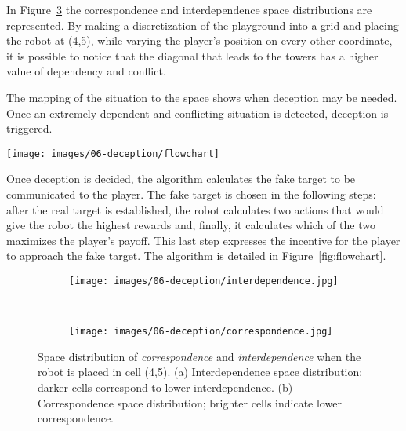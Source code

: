In Figure~\ref{fig::interdependece} the correspondence and interdependence space distributions are represented. By making a discretization of the playground into a grid and placing the robot at (4,5), while varying the  player's position on every other coordinate, it is possible to notice that the diagonal that leads to the towers has a higher value of dependency and conflict.

The mapping of the situation to the space shows when deception may be needed. Once an extremely dependent and conflicting situation is detected, deception is triggered.

\begin{figure*}[t]
\centering
\texttt{[image: images/06-deception/flowchart]}
\caption{The procedure to select deception.}
\label{fig:flowchart}
\end{figure*}



Once deception is decided, the algorithm calculates the fake target to be communicated to the player. The fake target is chosen in the following steps: after the real target is established, the robot calculates two actions that would give the robot the highest rewards and, finally, it calculates which of the two maximizes the player's payoff. This last step expresses the incentive for the player to approach the fake target. The algorithm is detailed in Figure~\ref{fig:flowchart}.

\begin{figure}[H]
    \centering
    \begin{subfigure}[t]{0.49\columnwidth}
        \centering
        \texttt{[image: images/06-deception/interdependence.jpg]}
        \caption{}
        \label{fig:interdipendence}
    \end{subfigure}
    ~
    \begin{subfigure}[t]{0.49\columnwidth}
        \centering
        \texttt{[image: images/06-deception/correspondence.jpg]}
        \caption{}
        \label{fig:correspondence}
    \end{subfigure}
    \caption{Space distribution of \textit{correspondence} and \textit{interdependence} when the robot is placed in cell (4,5). (a) Interdependence space distribution; darker cells correspond to lower interdependence. (b) Correspondence space distribution; brighter cells indicate lower correspondence.}
    \label{fig::interdependece}
\end{figure}


